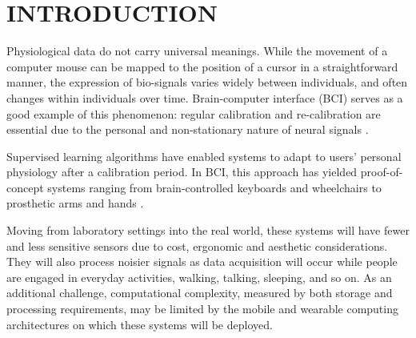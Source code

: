 \section{\uppercase{Introduction}}
\label{sec:introduction}

\noindent Physiological data do not carry universal meanings. While the movement of a computer mouse can be mapped to the position of a cursor in a straightforward manner, the expression of bio-signals varies widely between individuals, and often changes within individuals over time. Brain-computer interface (BCI) serves as a good example of this phenomenon: regular calibration and re-calibration are essential due to the personal and non-stationary nature of neural signals \cite{dornhege_toward_2007,mcfarland_brain-computer_2011}.

Supervised learning algorithms have enabled systems to adapt to users' personal physiology after a calibration period. In BCI, this approach has yielded proof-of-concept systems ranging from brain-controlled keyboards and wheelchairs to prosthetic arms and hands \cite{blankertz_note_2007,millan_combining_2010,d._mattia_brain_2011,hill_practical_2014,campbell_neurophone:_2010}. 



Moving from laboratory settings into the real world, these systems will have fewer and less sensitive sensors due to cost, ergonomic and aesthetic considerations. They will also process noisier signals as data acquisition will occur while people are engaged in everyday activities, walking, talking, sleeping, and so on. As an additional challenge, computational complexity, measured by both storage and processing requirements, may be limited by the mobile and wearable computing architectures on which these systems will be deployed. 

